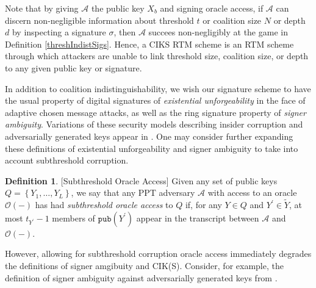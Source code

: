 \documentclass[12pt,english,oneside]{mrl}
\theoremstyle{definition}
\newtheorem{Defn}[lem]{Definition}
\newenvironment{defn}{\begin{Defn}\rm}{\end{Defn}}
\numberwithin{equation}{section}
\numberwithin{figure}{section}
\numberwithin{equation}{section}
\numberwithin{equation}{section}
\numberwithin{figure}{section}
\begin{document}
Note that by giving $\mathcal{A}$ the public key $X_b$ and signing oracle access, if $\mathcal{A}$ can discern non-negligible information about threshold $t$ or coalition size $N$ or depth $d$ by inspecting a signature $\sigma$, then $\mathcal{A}$ succees non-negligibly at the game in Definition \ref{threshIndistSigs}. Hence, a CIKS RTM scheme is an RTM scheme through which attackers are unable to link threshold size, coalition size, or depth to any given public key or signature.

In addition to coalition indistinguishability, we wish our signature scheme to have the usual property of digital signatures of \textit{existential unforgeability} in the face of adaptive chosen message attacks, as well as the ring signature property of \textit{signer ambiguity}. Variations of these security models describing insider corruption and adversarially generated keys appear in \cite{bender2006ring}. One may consider further expanding these definitions of existential unforgeability and signer ambiguity to take into account subthreshold corruption. 

\begin{defn}{[Subthreshold Oracle Access]}
Given any set of public keys $Q = \left\{Y_1, \ldots, Y_L\right\}$, we say that any PPT adversary $\mathcal{A}$ with access to an oracle $\mathcal{O}(-)$ has had \textit{subthreshold oracle access} to $Q$ if, for any $Y \in Q$ and $Y^{\prime} \in \tilde{Y}$, at most $t_{Y^{\prime}}-1$ members of $\texttt{pub}(Y^{\prime})$ appear in the transcript between $\mathcal{A}$ and $\mathcal{O}(-)$.
\end{defn}

However, allowing for subthreshold corruption oracle access immediately degrades the definitions of signer amgibuity and CIK(S). Consider, for example, the definition of signer ambiguity against adversarially generated keys from \cite{bender2006ring}.
\end{document}
